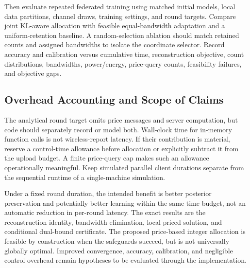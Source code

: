Then evaluate repeated federated training using matched initial models, local data partitions, channel draws, training settings, and round targets. Compare joint KL-aware allocation with feasible equal-bandwidth adaptation and a uniform-retention baseline. A random-selection ablation should match retained counts and assigned bandwidths to isolate the coordinate selector. Record accuracy and calibration versus cumulative time, reconstruction objective, count distributions, bandwidths, power/energy, price-query counts, feasibility failures, and objective gaps.

\subsection{Overhead Accounting and Scope of Claims}
The analytical round target omits price messages and server computation, but code should separately record or model both. Wall-clock time for in-memory function calls is not wireless-report latency. If their contribution is material, reserve a control-time allowance before allocation or explicitly subtract it from the upload budget. A finite price-query cap makes such an allowance operationally meaningful. Keep simulated parallel client durations separate from the sequential runtime of a single-machine simulation.

Under a fixed round duration, the intended benefit is better posterior preservation and potentially better learning within the same time budget, not an automatic reduction in per-round latency. The exact results are the reconstruction identity, bandwidth elimination, local priced solution, and conditional dual-bound certificate. The proposed price-based integer allocation is feasible by construction when the safeguards succeed, but is not universally globally optimal. Improved convergence, accuracy, calibration, and negligible control overhead remain hypotheses to be evaluated through the implementation.

